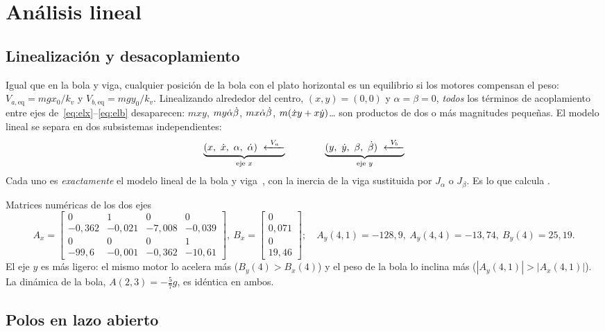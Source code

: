 \chapter{Análisis lineal}
\label{cap:analisis}

\section{Linealización y desacoplamiento}

Igual que en la bola y viga, cualquier posición de la bola con el plato horizontal es un equilibrio si los motores compensan el peso: $V_{a,\text{eq}}=mgx_0/k_v$ y $V_{b,\text{eq}}=mgy_0/k_v$. Linealizando alrededor del centro, $(x,y)=(0,0)$ y $\alpha=\beta=0$, \emph{todos} los términos de acoplamiento entre ejes de~\eqref{eq:elx}--\eqref{eq:elb} desaparecen: $mxy$, $my\dot{\alpha}\dot{\beta}$, $mx\dot{\alpha}\dot{\beta}$, $m(\dot{x} y+x\dot{y})$\ldots{} son productos de dos o más magnitudes pequeñas. El modelo lineal se separa en dos subsistemas independientes:
\begin{equation}
  \underbrace{(x,\ \xd,\ \alpha,\ \ald)\ \xleftarrow{\ V_a\ }}_{\text{eje }x}
  \qquad\qquad
  \underbrace{(y,\ \yd,\ \beta,\ \bed)\ \xleftarrow{\ V_b\ }}_{\text{eje }y}
\end{equation}
Cada uno es \emph{exactamente} el modelo lineal de la bola y viga~\cite{viga}, con la inercia de la viga sustituida por $J_\alpha$ o $J_\beta$. Es lo que calcula .

\begin{ejemplo}{Matrices numéricas de los dos ejes}
\[
A_x=\begin{bmatrix}0&1&0&0\\ -0{,}362&-0{,}021&-7{,}008&-0{,}039\\ 0&0&0&1\\ -99{,}6&-0{,}001&-0{,}362&-10{,}61\end{bmatrix},\
B_x=\begin{bmatrix}0\\ 0{,}071\\ 0\\ 19{,}46\end{bmatrix};
\quad
A_y(4,1)=-128{,}9,\ A_y(4,4)=-13{,}74,\ B_y(4)=25{,}19.
\]
El eje $y$ es más ligero: el mismo motor lo acelera más ($B_y(4)>B_x(4)$) y el peso de la bola lo inclina más ($|A_y(4,1)|>|A_x(4,1)|$). La dinámica de la bola, $A(2,3)=-\tfrac57g$, es idéntica en ambos.
\end{ejemplo}

\section{Polos en lazo abierto}

